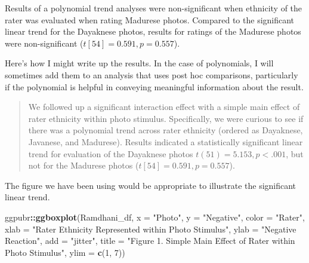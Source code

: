 \documentclass[
  11pt,
]{book}
\newenvironment{Shaded}{\begin{snugshade}}{\end{snugshade}}
\newcommand{\AttributeTok}[1]{\textcolor[rgb]{0.27,0.27,0.27}{#1}}
\newcommand{\DecValTok}[1]{\textcolor[rgb]{0.06,0.06,0.06}{#1}}
\newcommand{\FunctionTok}[1]{\textcolor[rgb]{0.27,0.27,0.27}{\textbf{#1}}}
\newcommand{\NormalTok}[1]{#1}
\newcommand{\SpecialCharTok}[1]{\textcolor[rgb]{0.43,0.43,0.43}{\textbf{#1}}}
\newcommand{\StringTok}[1]{\textcolor[rgb]{0.5,0.5,0.5}{#1}}
\begin{document}
Results of a polynomial trend analyses were non-significant when ethnicity of the rater was evaluated when rating Madurese photos. Compared to the significant linear trend for the Dayaknese photos, results for ratings of the Madurese photos were non-significant (\(t[54] = 0.591, p = 0.557\)).

Here's how I might write up the results. In the case of polynomials, I will sometimes add them to an analysis that uses post hoc comparisons, particularly if the polynomial is helpful in conveying meaningful information about the result.

\begin{quote}
We followed up a significant interaction effect with a simple main effect of rater ethnicity within photo stimulus. Specifically, we were curious to see if there was a polynomial trend across rater ethnicity (ordered as Dayaknese, Javanese, and Madurese). Results indicated a statistically significant linear trend for evaluation of the Dayaknese photos \(t(51) = 5.153, p < .001\), but not for the Madurese photos (\(t[54] = 0.591, p = 0.557\)).
\end{quote}

The figure we have been using would be appropriate to illustrate the significant linear trend.

\begin{Shaded}
\begin{Highlighting}[]
\NormalTok{ggpubr}\SpecialCharTok{::}\FunctionTok{ggboxplot}\NormalTok{(Ramdhani\_df, }\AttributeTok{x =} \StringTok{"Photo"}\NormalTok{, }\AttributeTok{y =} \StringTok{"Negative"}\NormalTok{, }\AttributeTok{color =} \StringTok{"Rater"}\NormalTok{,}
    \AttributeTok{xlab =} \StringTok{"Rater Ethnicity Represented within Photo Stimulus"}\NormalTok{, }\AttributeTok{ylab =} \StringTok{"Negative Reaction"}\NormalTok{,}
    \AttributeTok{add =} \StringTok{"jitter"}\NormalTok{, }\AttributeTok{title =} \StringTok{"Figure 1. Simple Main Effect of Rater within Photo Stimulus"}\NormalTok{,}
    \AttributeTok{ylim =} \FunctionTok{c}\NormalTok{(}\DecValTok{1}\NormalTok{, }\DecValTok{7}\NormalTok{))}
\end{Highlighting}
\end{Shaded}
\end{document}
